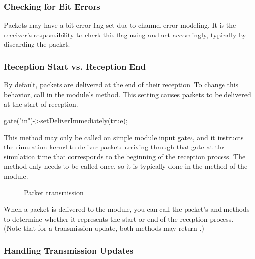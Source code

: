 \subsubsection{Checking for Bit Errors}
\label{sec:simple-modules:checking-bit-errors}

Packets may have a bit error flag set due to channel error modeling. It is the
receiver's responsibility to check this flag using  and
act accordingly, typically by discarding the packet.

\subsubsection{Reception Start vs. Reception End}
\label{sec:simple-modules:reception-start-vs-end}

By default, packets are delivered at the end of their reception. To change this
behavior, call  in the module's
 method. This setting causes packets to be delivered at the
start of reception.

\begin{cpp}
gate("in")->setDeliverImmediately(true);
\end{cpp}

This method may only be called on simple module input gates, and it
instructs the simulation kernel to deliver packets arriving through
that gate at the simulation time that corresponds to the
beginning of the reception process.
The  method only needs to be called once,
so it is typically done in the  method of the module.

\begin{figure}[htbp]
  \begin{center}
    
    \caption{Packet transmission}
    \label{fig:ch-simple-modules:transmission}
  \end{center}
\end{figure}

When a packet is delivered to the module, you can call the packet's
 and  methods to
determine whether it represents the start or end of the reception process.
(Note that for a transmission update, both methods may return .)


\subsubsection{Handling Transmission Updates}
\label{sec:simple-modules:reception-of-transmission-updates}


